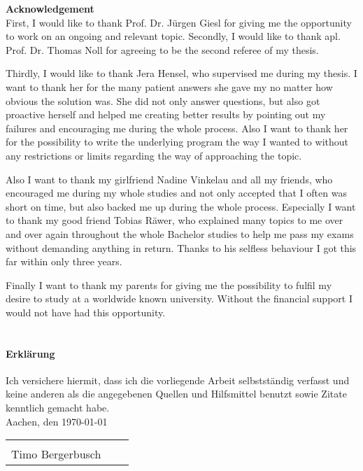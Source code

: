 {\bf\Large Acknowledgement} \\ [1em] 

First, I would like to thank Prof. Dr. Jürgen Giesl for giving me the opportunity to work on an ongoing and relevant topic.
Secondly, I would like to thank apl. Prof. Dr. Thomas Noll for agreeing to be the second referee of my thesis.

Thirdly, I would like to thank Jera Hensel, who supervised me during my thesis. I want to thank her for the many patient answers she gave my no matter how obvious the solution was. She did not only answer questions, but also got proactive herself and helped me creating better results by pointing out my failures and encouraging me during the whole process. Also I want to thank her for the possibility to write the underlying program the way I wanted to without any restrictions or limits regarding the way of approaching the topic. 

Also I want to thank my girlfriend Nadine Vinkelau and all my friends, who encouraged me during my whole studies and not only accepted that I often was short on time, but also backed me up during the whole process. Especially I want to thank my good friend Tobias Räwer, who explained many topics to me over and over again throughout the whole Bachelor studies to help me pass my exams without demanding anything in return. Thanks to his selfless behaviour I got this far within only three years.

Finally I want to thank my parents for giving me the possibility to fulfil my desire to study at a worldwide known university. Without the financial support I would not have had this opportunity. \\ \\

\paragraph{Erklärung} Ich versichere hiermit, dass ich die vorliegende Arbeit selbstständig verfasst und keine
anderen als die angegebenen Quellen und Hilfsmittel benutzt sowie Zitate kenntlich
gemacht habe.\newline \\
Aachen, den \myformat\today

\begin{tabular}{lp{2em}l} 
	\hspace{4cm} \\\cline{1-1}\cline{3-3} 
	Timo Bergerbusch
\end{tabular}
